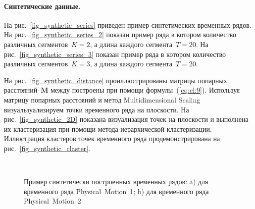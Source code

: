 \documentclass[12pt, twoside]{article}
\numberwithin{equation}{section}
\begin{document}
\paragraph{Синтетические данные.}


На рис.~\ref{fig_synthetic_series} приведен пример синтетических временных рядов. На рис.~\ref{fig_synthetic_series_2} показан пример ряда в котором количество различных сегментов~$K = 2$, а длина каждого сегмента~$T = 20$. На рис.~\ref{fig_synthetic_series_3} показан пример ряда в котором количество различных сегментов~$K = 3$, а длина каждого сегмента~$T = 20$. 

На рис.~\ref{fig_synthetic_distance} проиллюстрированы матрицы попарных расстояний~$\textbf{M}$ между построены при помощи формулы~(\ref{eq:cl:9}). Используя матрицу попарных расстояний и метод Multidimensional Scaling~\cite{Borg2005} визуальзуализируем точки временного ряда на плоскости. На рис.~\ref{fig_synthetic_2D} показана визуализация точек на плоскости и выполнена их кластеризация при помощи метода иерархической кластеризации. Иллюстрация кластеров точек временного ряда продемонстрирована на рис.~\ref{fig_synthetic_claster}.

\begin{figure}[h!t]\center
{}
\\
\caption{Пример синтетически построенных временных рядов: a) для временного ряда Physical~Motion~1; b) для временного ряда Physical~Motion~2}
\label{fig_real_series}
\end{figure}
\end{document}
